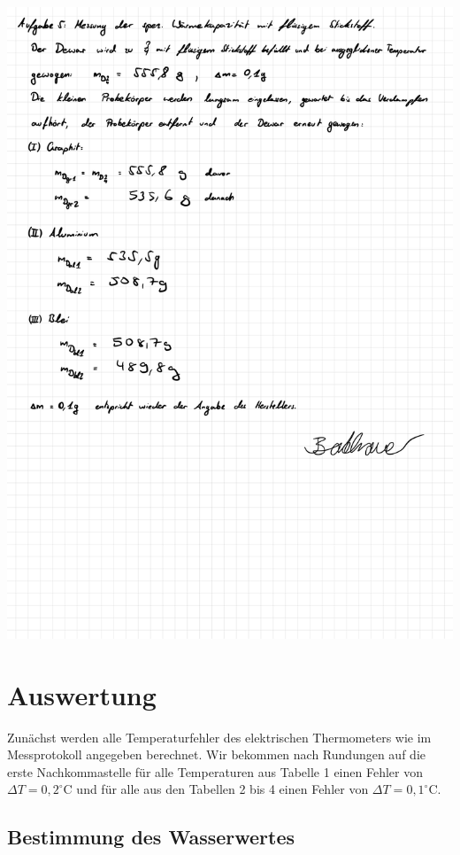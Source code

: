 \documentclass{article}
\begin{document}
\includegraphics[width=\textwidth]{graphics/mess4.jpg}
\newpage

\addtocounter{table}{4}

\section{Auswertung}

Zunächst werden alle Temperaturfehler des elektrischen Thermometers wie im Messprotokoll angegeben berechnet. Wir bekommen nach Rundungen auf die erste Nachkommastelle für alle Temperaturen aus Tabelle 1 einen Fehler von $\Delta T = 0,2^\circ$C und für alle aus den Tabellen 2 bis 4 einen Fehler von $\Delta T = 0,1^\circ$C.


\subsection{Bestimmung des Wasserwertes}
\end{document}
